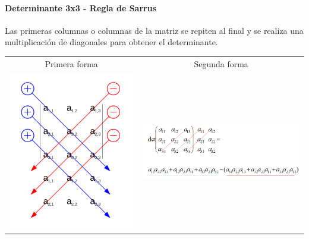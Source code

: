 \documentclass[stu, 12pt, a4paper, donotrepeattitle, floatsintext, natbib]{apa7}
\begin{document}
    \paragraph{Determinante 3x3 - Regla de Sarrus}
    Las primeras columnas o columnas de la matriz se repiten al final y se realiza una multiplicación de diagonales para obtener el determinante.\\
    \begin{table}
        \label{tab:sarrus}
        \begin{tabular}{cc}

            Primera forma & Segunda forma \\
            \includegraphics[scale=0.25]{sarrus}
            &
            \includegraphics[scale=0.5]{sarrus2}

        \end{tabular}
    \end{table}
\end{document}

